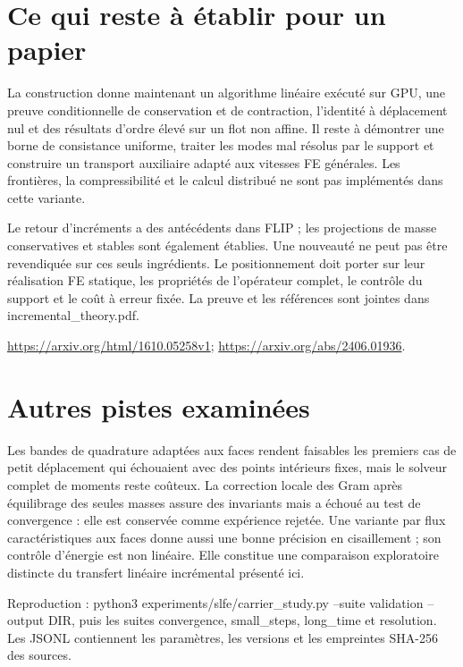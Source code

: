\documentclass[10pt,a4paper]{article}
\begin{document}
\section{Ce qui reste à établir pour un papier}
La construction donne maintenant un algorithme linéaire exécuté sur GPU, une preuve conditionnelle de conservation et de contraction, l'identité à déplacement nul et des résultats d'ordre élevé sur un flot non affine. Il reste à démontrer une borne de consistance uniforme, traiter les modes mal résolus par le support et construire un transport auxiliaire adapté aux vitesses FE générales. Les frontières, la compressibilité et le calcul distribué ne sont pas implémentés dans cette variante.

Le retour d'incréments a des antécédents dans FLIP ; les projections de masse conservatives et stables sont également établies. Une nouveauté ne peut pas être revendiquée sur ces seuls ingrédients. Le positionnement doit porter sur leur réalisation FE statique, les propriétés de l'opérateur complet, le contrôle du support et le coût à erreur fixée. La preuve et les références sont jointes dans incremental\_theory.pdf.

\url{https://arxiv.org/html/1610.05258v1}; \url{https://arxiv.org/abs/2406.01936}.
\section{Autres pistes examinées}
Les bandes de quadrature adaptées aux faces rendent faisables les premiers cas de petit déplacement qui échouaient avec des points intérieurs fixes, mais le solveur complet de moments reste coûteux. La correction locale des Gram après équilibrage des seules masses assure des invariants mais a échoué au test de convergence : elle est conservée comme expérience rejetée. Une variante par flux caractéristiques aux faces donne aussi une bonne précision en cisaillement ; son contrôle d'énergie est non linéaire. Elle constitue une comparaison exploratoire distincte du transfert linéaire incrémental présenté ici.

Reproduction : python3 experiments/slfe/carrier\_study.py --suite validation --output DIR, puis les suites convergence, small\_steps, long\_time et resolution. Les JSONL contiennent les paramètres, les versions et les empreintes SHA-256 des sources.
\end{document}
